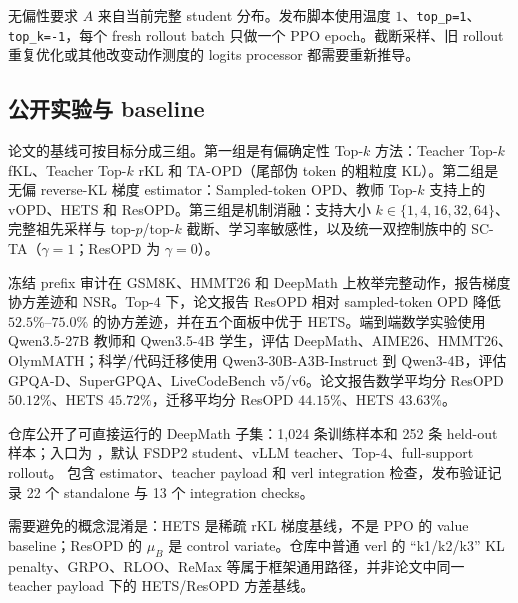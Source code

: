 无偏性要求 $A$ 来自当前完整 student 分布。发布脚本使用温度 $1$、\texttt{top\_p=1}、\texttt{top\_k=-1}，每个 fresh rollout batch 只做一个 PPO epoch。截断采样、旧 rollout 重复优化或其他改变动作测度的 logits processor 都需要重新推导。

\subsection{公开实验与 baseline}

论文的基线可按目标分成三组。第一组是有偏确定性 Top-$k$ 方法：Teacher Top-$k$ fKL、Teacher Top-$k$ rKL 和 TA-OPD（尾部伪 token 的粗粒度 KL）。第二组是无偏 reverse-KL 梯度 estimator：Sampled-token OPD、教师 Top-$k$ 支持上的 vOPD、HETS 和 ResOPD。第三组是机制消融：支持大小 $k\in\{1,4,16,32,64\}$、完整祖先采样与 top-$p$/top-$k$ 截断、学习率敏感性，以及统一双控制族中的 SC-TA（$\gamma=1$；ResOPD 为 $\gamma=0$）。

冻结 prefix 审计在 GSM8K、HMMT26 和 DeepMath 上枚举完整动作，报告梯度协方差迹和 NSR。Top-$4$ 下，论文报告 ResOPD 相对 sampled-token OPD 降低 $52.5\%$--$75.0\%$ 的协方差迹，并在五个面板中优于 HETS。端到端数学实验使用 Qwen3.5-27B 教师和 Qwen3.5-4B 学生，评估 DeepMath、AIME26、HMMT26、OlymMATH；科学/代码迁移使用 Qwen3-30B-A3B-Instruct 到 Qwen3-4B，评估 GPQA-D、SuperGPQA、LiveCodeBench v5/v6。论文报告数学平均分 ResOPD $50.12\%$、HETS $45.72\%$，迁移平均分 ResOPD $44.15\%$、HETS $43.63\%$。

仓库公开了可直接运行的 DeepMath 子集：1,024 条训练样本和 252 条 held-out 样本；入口为 ，默认 FSDP2 student、vLLM teacher、Top-$4$、full-support rollout。 包含 estimator、teacher payload 和 verl integration 检查，发布验证记录 22 个 standalone 与 13 个 integration checks。

需要避免的概念混淆是：HETS 是稀疏 rKL 梯度基线，不是 PPO 的 value baseline；ResOPD 的 $\mu_B$ 是 control variate。仓库中普通 verl 的 ``k1/k2/k3'' KL penalty、GRPO、RLOO、ReMax 等属于框架通用路径，并非论文中同一 teacher payload 下的 HETS/ResOPD 方差基线。
